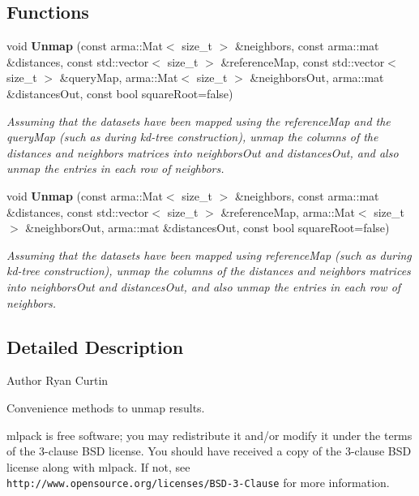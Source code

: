 \subsection*{Functions}
\begin{DoxyCompactItemize}
\item 
void \textbf{ Unmap} (const arma\+::\+Mat$<$ size\+\_\+t $>$ \&neighbors, const arma\+::mat \&distances, const std\+::vector$<$ size\+\_\+t $>$ \&reference\+Map, const std\+::vector$<$ size\+\_\+t $>$ \&query\+Map, arma\+::\+Mat$<$ size\+\_\+t $>$ \&neighbors\+Out, arma\+::mat \&distances\+Out, const bool square\+Root=false)
\begin{DoxyCompactList}\small\item\em Assuming that the datasets have been mapped using the reference\+Map and the query\+Map (such as during kd-\/tree construction), unmap the columns of the distances and neighbors matrices into neighbors\+Out and distances\+Out, and also unmap the entries in each row of neighbors. \end{DoxyCompactList}\item 
void \textbf{ Unmap} (const arma\+::\+Mat$<$ size\+\_\+t $>$ \&neighbors, const arma\+::mat \&distances, const std\+::vector$<$ size\+\_\+t $>$ \&reference\+Map, arma\+::\+Mat$<$ size\+\_\+t $>$ \&neighbors\+Out, arma\+::mat \&distances\+Out, const bool square\+Root=false)
\begin{DoxyCompactList}\small\item\em Assuming that the datasets have been mapped using reference\+Map (such as during kd-\/tree construction), unmap the columns of the distances and neighbors matrices into neighbors\+Out and distances\+Out, and also unmap the entries in each row of neighbors. \end{DoxyCompactList}\end{DoxyCompactItemize}


\subsection{Detailed Description}
\begin{DoxyAuthor}{Author}
Ryan Curtin
\end{DoxyAuthor}
Convenience methods to unmap results.

mlpack is free software; you may redistribute it and/or modify it under the terms of the 3-\/clause B\+SD license. You should have received a copy of the 3-\/clause B\+SD license along with mlpack. If not, see {\tt http\+://www.\+opensource.\+org/licenses/\+B\+S\+D-\/3-\/\+Clause} for more information. 